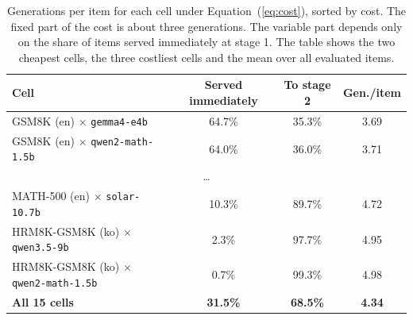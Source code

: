\begin{table}[t]
\small\setlength{\tabcolsep}{3pt}
\caption{Generations per item for each cell under Equation~(\ref{eq:cost}), sorted by cost. The fixed part of the cost is about three generations. The variable part depends only on the share of items served immediately at stage 1. The table shows the two cheapest cells, the three costliest cells and the mean over all evaluated items.\label{tab:cost}}
\begin{tabularx}{\textwidth}{lCCC}
\toprule
\textbf{Cell} & \textbf{Served immediately} & \textbf{To stage 2} & \textbf{Gen./item} \\
\midrule
GSM8K (en) $\times$ \texttt{gemma4-e4b} & 64.7\% & 35.3\% & 3.69 \\
GSM8K (en) $\times$ \texttt{qwen2-math-1.5b} & 64.0\% & 36.0\% & 3.71 \\
 \\
MATH-500 (en) $\times$ \texttt{solar-10.7b} & 10.3\% & 89.7\% & 4.72 \\
HRM8K-GSM8K (ko) $\times$ \texttt{qwen3.5-9b} & 2.3\% & 97.7\% & 4.95 \\
HRM8K-GSM8K (ko) $\times$ \texttt{qwen2-math-1.5b} & 0.7\% & 99.3\% & 4.98 \\
\midrule
\textbf{All 15 cells} & \textbf{31.5\%} & \textbf{68.5\%} & \textbf{4.34} \\
\bottomrule
\end{tabularx}
\end{table}
